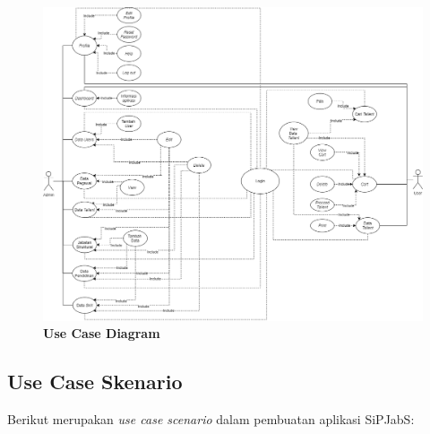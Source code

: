 \begin{figure}
	\centering
	\includegraphics[width=1\textwidth]
	{pics/diagram/usecase.png}
	\caption{\textbf{Use Case Diagram}}
	\label{fig:32}
\end{figure}


\subsection{Use Case Skenario}
Berikut merupakan \textit{use case scenario} dalam pembuatan aplikasi SiPJabS:

